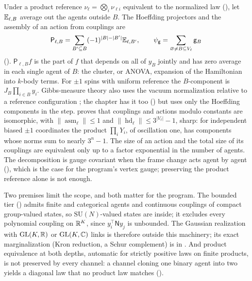 Under a product reference $\nu_\ell=\bigotimes_i\nu_{\ell i}$ equivalent to the normalized law
(), let $\mathbb E_{\ell,B}$ average out the agents outside $B$. The Hoeffding
projectors and the assembly of an action from couplings are
\[
\mathsf P_{\ell,B}=\sum_{B'\subseteq B}(-1)^{\lvert B\rvert-\lvert B'\rvert}\mathbb E_{\ell,B'},
\qquad
\psi_{\mathsf g}=\sum_{\varnothing\ne B\subseteq V_\ell}\mathsf g_B
\]
(). $\mathsf P_{\ell,B}f$ is the part of $f$ that depends on all of
$y_B$ jointly and has zero average in each single agent of $B$: the cluster, or ANOVA, expansion of the
Hamiltonian into $k$-body terms. For $\pm1$ spins with uniform reference the $B$-component is
$J_B\prod_{i\in B}y_i$. Gibbs-measure theory also uses the vacuum normalization relative to a reference
configuration \citep{Georgii1988}; the chapter has it too () but uses only
the Hoeffding components in the step.  proves that couplings
and actions modulo constants are isomorphic, with $\lVert\operatorname{asm}_\ell\rVert\le1$ and
$\lVert\operatorname{hd}_\ell\rVert\le3^{\lvert V_\ell\rvert}-1$, sharp: for independent biased $\pm1$
coordinates the product $\prod_iY_i$, of oscillation one, has components whose norms sum to nearly
$3^n-1$. The size of an action and the total size of its couplings are equivalent only up to a factor
exponential in the number of agents. The decomposition is gauge covariant when the frame change acts
agent by agent (), which is the case for the program's vertex
gauge; preserving the product reference alone is not enough.

Two premises limit the scope, and both matter for the program. The bounded tier
() admits finite and categorical agents and continuous couplings of
compact group-valued states, so $\mathrm{SU}(N)$-valued states are inside; it excludes every polynomial
coupling on $\mathbb R^K$, since $y_i^\top\mathsf Ny_j$ is unbounded. The Gaussian realization with $\mathrm{GL}(K,\mathbb R)$
or $\mathrm{GL}(K,\mathbb C)$ links is therefore outside this machinery; its exact marginalization (Kron
reduction, a Schur complement) is in . And product equivalence at both
depths, automatic for strictly positive laws on finite products, is not preserved by every channel: a
channel cloning one binary agent into two yields a diagonal law that no product law matches
().

